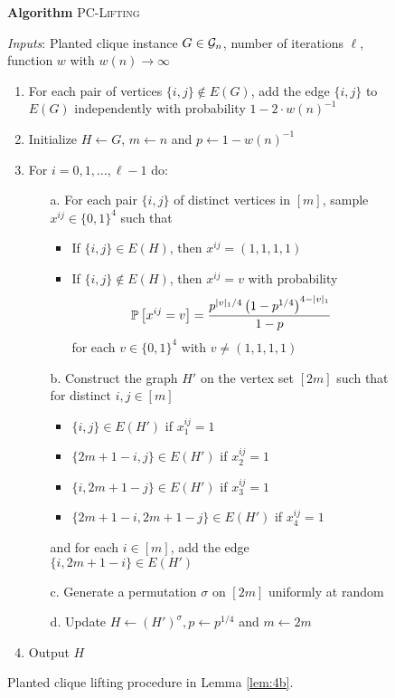 \begin{figure}[t!]
\begin{algbox}
\textbf{Algorithm} \textsc{PC-Lifting}

\vspace{2mm}

\textit{Inputs}: Planted clique instance $G \in \mathcal{G}_n$, number of iterations $\ell$, function $w$ with $w(n) \to \infty$
\begin{enumerate}
\item For each pair of vertices $\{i, j\} \not \in E(G)$, add the edge $\{i, j\}$ to $E(G)$ independently with probability $1 - 2 \cdot w(n)^{-1}$
\item Initialize $H \gets G$, $m \gets n$ and $p \gets 1 - w(n)^{-1}$
\item For $i = 0, 1, \dots, \ell - 1$ do:
\begin{enumerate}
\item[a.] For each pair $\{ i, j \}$ of distinct vertices in $[m]$, sample $x^{ij} \in \{0, 1\}^4$ such that
\begin{itemize}
\item If $\{i, j\} \in E(H)$, then $x^{ij} = (1, 1, 1, 1)$
\item If $\{i, j\} \not \in E(H)$, then $x^{ij} = v$ with probability
$$\mathbb{P}\left[x^{ij} = v\right] = \frac{p^{|v|_1/4} \left(1 - p^{1/4}\right)^{4 - |v|_1}}{1 - p}$$
for each $v \in \{0, 1\}^4$ with $v \neq (1, 1, 1, 1)$
\end{itemize}
\item[b.] Construct the graph $H'$ on the vertex set $[2m]$ such that for distinct $i, j \in [m]$
\begin{itemize}
\item $\{i, j \} \in E(H')$ if $x^{ij}_1 = 1$
\item $\{2m + 1 - i, j \} \in E(H')$ if $x^{ij}_2 = 1$
\item $\{i, 2m + 1 - j \} \in E(H')$ if $x^{ij}_3 = 1$
\item $\{2m + 1 - i, 2m + 1 - j \} \in E(H')$ if $x^{ij}_4 = 1$
\end{itemize}
and for each $i \in [m]$, add the edge $\{i, 2m + 1 - i \} \in E(H')$
\item[c.] Generate a permutation $\sigma$ on $[2m]$ uniformly at random
\item[d.] Update $H \gets (H')^\sigma, p \gets p^{1/4}$ and $m \gets 2m$
\end{enumerate}
\item Output $H$
\end{enumerate}
\vspace{1mm}
\end{algbox}
\caption{Planted clique lifting procedure in Lemma \ref{lem:4b}.}
\label{fig:pclifting}
\end{figure}

